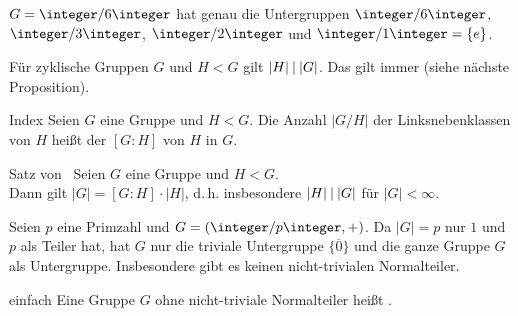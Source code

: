 \begin{Bsp}
    $G = \integer/6\integer$ hat genau die Untergruppen
    $\integer/6\integer$, $\integer/3\integer$, $\integer/2\integer$ und
    $\integer/1\integer = \{e\}$.
\end{Bsp}

\begin{Bem}
    Für zyklische Gruppen $G$ und $H < G$ gilt $|H| \mathbin{|} |G|$.
    Das gilt immer (siehe nächste Proposition).
\end{Bem}

\linie

\begin{Def}{Index}
    Seien $G$ eine Gruppe und $H < G$.
    Die Anzahl $|G/H|$ der Linksnebenklassen von $H$ heißt der
     $[G:H]$ von $H$ in $G$.
\end{Def}

\begin{Prop}{Satz von \upshape\,\!}
    Seien $G$ eine Gruppe und $H < G$.\\
    Dann gilt $|G| = [G:H] \cdot |H|$, d.\,h.
    insbesondere $|H| \mathbin{|} |G|$ für $|G| < \infty$.
\end{Prop}

\begin{Bem}
    Seien $p$ eine Primzahl und $G = (\integer/p\integer, +)$.
    Da $|G| = p$ nur $1$ und $p$ als Teiler hat, hat $G$ nur die
    triviale Untergruppe $\{\overline{0}\}$ und die ganze Gruppe $G$
    als Untergruppe.
    Insbesondere gibt es keinen nicht-trivialen Normalteiler.
\end{Bem}

\begin{Def}{einfach}
    Eine Gruppe $G$ ohne nicht-triviale Normalteiler heißt .
\end{Def}

\linie
\pagebreak

